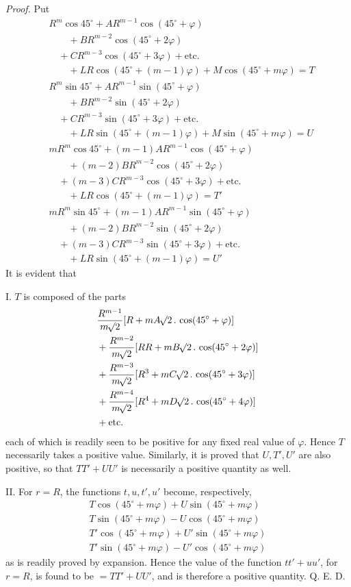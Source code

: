\textit{Proof.} Put
\[
\begin{aligned}
&R^m\cos45^\circ+AR^{m-1}\cos(45^\circ+\varphi)\\
&\qquad+BR^{m-2}\cos(45^\circ+2\varphi)\\
&\quad+CR^{m-3}\cos(45^\circ+3\varphi)+\text{etc.}\\
&\qquad+LR\cos(45^\circ+(m-1)\varphi)+M\cos(45^\circ+m\varphi)=T\\
&R^m\sin45^\circ+AR^{m-1}\sin(45^\circ+\varphi)\\
&\qquad+BR^{m-2}\sin(45^\circ+2\varphi)\\
&\quad+CR^{m-3}\sin(45^\circ+3\varphi)+\text{etc.}\\
&\qquad+LR\sin(45^\circ+(m-1)\varphi)+M\sin(45^\circ+m\varphi)=U\\
&mR^m\cos45^\circ+(m-1)AR^{m-1}\cos(45^\circ+\varphi)\\
&\qquad+(m-2)BR^{m-2}\cos(45^\circ+2\varphi)\\
&\quad+(m-3)CR^{m-3}\cos(45^\circ+3\varphi)+\text{etc.}\\
&\qquad+LR\cos(45^\circ+(m-1)\varphi)=T'\\
&mR^m\sin45^\circ+(m-1)AR^{m-1}\sin(45^\circ+\varphi)\\
&\qquad+(m-2)BR^{m-2}\sin(45^\circ+2\varphi)\\
&\quad+(m-3)CR^{m-3}\sin(45^\circ+3\varphi)+\text{etc.}\\
&\qquad+LR\sin(45^\circ+(m-1)\varphi)=U'
\end{aligned}
\]
It is evident that

I. $T$ is composed of the parts
\[
\begin{aligned}
&\frac{R^{m-1}}{m\BareRoot{2}}[R+mA\BareRoot{2}\, .\,\cos(45^\circ+\varphi)]\\
&+\frac{R^{m-2}}{m\BareRoot{2}}[RR+mB\BareRoot{2}\, .\,\cos(45^\circ+2\varphi)]\\
&+\frac{R^{m-3}}{m\BareRoot{2}}[R^3+mC\BareRoot{2}\, .\,\cos(45^\circ+3\varphi)]\\
&+\frac{R^{m-4}}{m\BareRoot{2}}[R^4+mD\BareRoot{2}\, .\,\cos(45^\circ+4\varphi)]\\
&+\text{etc.}
\end{aligned}
\]
each of which is readily seen to be positive for any fixed real value of $\varphi$. Hence $T$ necessarily takes a positive value. Similarly, it is proved that $U,T',U'$ are also positive, so that $TT'+UU'$ is necessarily a positive quantity as well.

II. For $r=R$, the functions $t,u,t',u'$ become, respectively,
\[
\begin{gathered}
T\cos(45^\circ+m\varphi)+U\sin(45^\circ+m\varphi)\\
T\sin(45^\circ+m\varphi)-U\cos(45^\circ+m\varphi)\\
T'\cos(45^\circ+m\varphi)+U'\sin(45^\circ+m\varphi)\\
T'\sin(45^\circ+m\varphi)-U'\cos(45^\circ+m\varphi)
\end{gathered}
\]
as is readily proved by expansion. Hence the value of the function $tt'+uu'$, for $r=R$, is found to be $=TT'+UU'$, and is therefore a positive quantity. Q. E. D.

